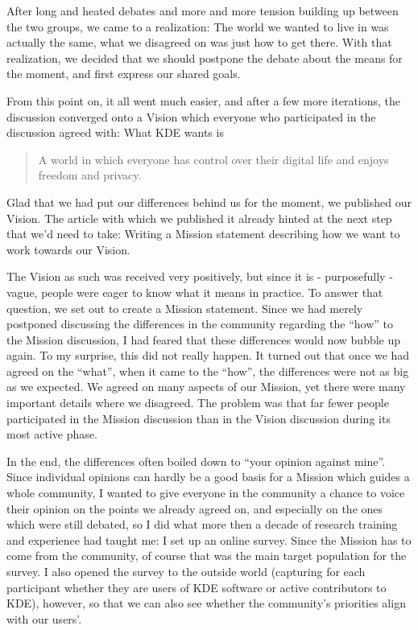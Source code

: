 After long and heated debates and more and more tension building up between the two groups, we came to a realization: The world we wanted to live in was actually the same, what we disagreed on was just how to get there. With that realization, we decided that we should postpone the debate about the means for the moment, and first express our shared goals.

From this point on, it all went much easier, and after a few more iterations, the discussion converged onto a Vision which everyone who participated in the discussion agreed with: What KDE wants is
\begin{quote}
 A world in which everyone has control over their digital life and enjoys freedom and privacy.
\end{quote}
Glad that we had put our differences behind us for the moment, we published our Vision. The article with which we published it already hinted at the next step that we'd need to take: Writing a Mission statement describing how we want to work towards our Vision.

The Vision as such was received very positively, but since it is - purposefully - vague, people were eager to know what it means in practice. To answer that question, we set out to create a Mission statement. Since we had merely postponed discussing the differences in the community regarding the ``how'' to the Mission discussion, I had feared that these differences would now bubble up again. To my surprise, this did not really happen. It turned out that once we had agreed on the ``what'', when it came to the ``how'', the differences were not as big as we expected. We agreed on many aspects of our Mission, yet there were many important details where we disagreed. The problem was that far fewer people participated in the Mission discussion than in the Vision discussion during its most active phase.

In the end, the differences often boiled down to ``your opinion against mine''. Since individual opinions can hardly be a good basis for a Mission which guides a whole community, I wanted to give everyone in the community a chance to voice their opinion on the points we already agreed on, and especially on the ones which were still debated, so I did what more then a decade of research training and experience had taught me: I set up an online survey. Since the Mission has to come from the community, of course that was the main target population for the survey. I also opened the survey to the outside world (capturing for each participant whether they are users of KDE software or active contributors to KDE), however, so that we can also see whether the community's priorities align with our users'.

